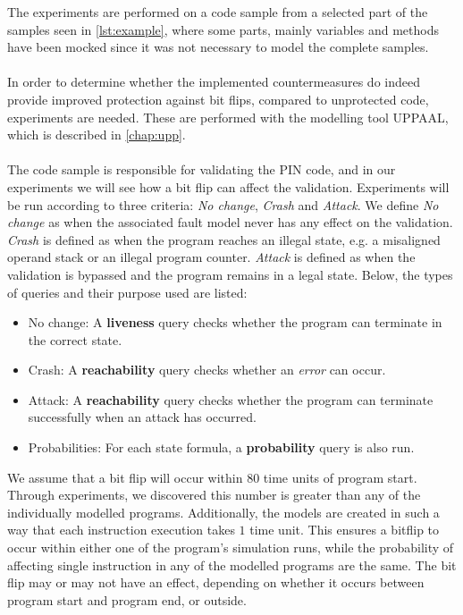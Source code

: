 The experiments are performed on a code sample from a selected part of the \jc samples seen in \cref{lst:example}, where some parts, mainly variables and methods have been mocked since it was not necessary to model the complete samples.\\\\
In order to determine whether the implemented countermeasures do indeed provide improved protection against bit flips, compared to unprotected code, experiments are needed. These are performed with the modelling tool UPPAAL, which is described in \cref{chap:upp}.\\\\
The code sample is responsible for validating the PIN code, and in our experiments we will see how a bit flip can affect the validation. Experiments will be run according to three criteria: \textit{No change}, \textit{Crash} and \textit{Attack}. We define \textit{No change} as when the associated fault model never has any effect on the validation. \textit{Crash} is defined as when the program reaches an illegal state, e.g. a misaligned operand stack or an illegal program counter. \textit{Attack} is defined as when the validation is bypassed and the program remains in a legal state. Below, the types of queries and their purpose used are listed:

\begin{itemize}
\item No change: A \textbf{liveness} query checks whether the program can terminate in the correct state.
\item Crash: A \textbf{reachability} query checks whether an \textit{error} can occur.
\item Attack: A \textbf{reachability} query checks whether the program can terminate successfully when an attack has occurred.
\item Probabilities: For each state formula, a \textbf{probability} query is also run.
\end{itemize}

\noindent We assume that a bit flip will occur within $80$ time units of program start. Through experiments, we discovered this number is greater than any of the individually modelled programs. Additionally, the models are created in such a way that each instruction execution takes $1$ time unit. This ensures a bitflip to occur within either one of the program's simulation runs, while the probability of affecting single instruction in any of the modelled programs are the same. The bit flip may or may not have an effect, depending on whether it occurs between program start and program end, or outside.